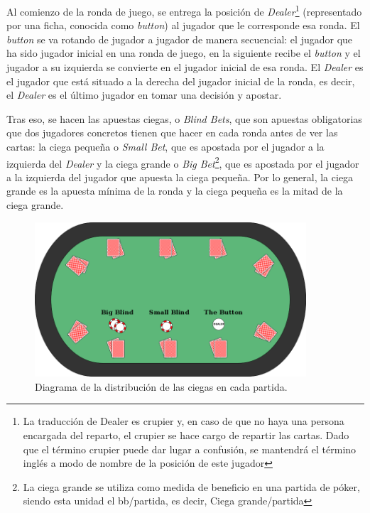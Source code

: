 Al comienzo de la ronda de juego, se entrega la posición de \textit{Dealer}\footnote{La traducción de Dealer es crupier y, en caso de que no haya una persona encargada del reparto, el crupier se hace cargo de repartir las cartas. Dado que el término crupier puede dar lugar a confusión, se mantendrá el término inglés a modo de nombre de la posición de este jugador} (representado por una ficha, conocida como \textit{button}) al jugador que le corresponde esa ronda. El \textit{button} se va rotando de jugador a jugador de manera secuencial: el jugador que ha sido jugador inicial en una ronda de juego, en la siguiente recibe el \textit{button} y el jugador a su izquierda se convierte en el jugador inicial de esa ronda.  El \textit{Dealer} es el jugador que está situado a la derecha del jugador inicial de la ronda, es decir, el \textit{Dealer} es el último jugador en tomar una decisión y apostar.

Tras eso, se hacen las apuestas ciegas, o \textit{Blind Bets}, que son apuestas obligatorias que dos jugadores concretos tienen que hacer en cada ronda antes de ver las cartas: la ciega pequeña o \textit{Small Bet}, que es apostada por el jugador a la izquierda del \textit{Dealer} y la ciega grande o \textit{Big Bet}\footnote{La ciega grande se utiliza como medida de beneficio en una partida de póker, siendo esta unidad el bb/partida, es decir, Ciega grande/partida }, que es apostada por el jugador a la izquierda del jugador que apuesta la ciega pequeña. Por lo general, la ciega grande es la apuesta mínima de la ronda y la ciega pequeña es la mitad de la ciega grande.

\begin{figure}[h]
\centering
\includegraphics[width=0.90\textwidth]{figuras/Holdem_mesa.png}   
\caption{Diagrama de la distribución de las ciegas en cada partida.\cite{holdem_mesa}}
\label{fig:mesa_bids}
\end{figure}

